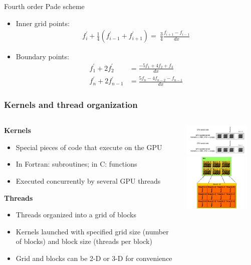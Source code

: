 \documentclass[10pt]{beamer}
\begin{document}
\begin{frame}{Fourth order Pade scheme}
\begin{itemize}
\item{Inner grid points:
\begin{align*}
f_i^{\prime} + \frac{1}{4}(f^{\prime}_{i-1} + f^{\prime}_{i+1}) = \
\frac{3}{4}\frac{f_{i+1} - f_{i-1}}{dx}
\end{align*}}

\item{Boundary points:
\begin{align*}
f^{\prime}_1 + 2f^{\prime}_2 &= \frac{-5f_1 + 4f_2 + f_3}{dx} \\
%
f^{\prime}_{n} + 2f^{\prime}_{n-1}
&=
\frac{5f_{n} - 4f_{n-2} -  f_{n-1}}{dx}
\end{align*}}
\end{itemize}
\end{frame}

\begin{frame}
\frametitle{Kernels and thread organization}
\begin{columns}
\begin{column}{0.5\textwidth}
\textbf{Kernels}
\begin{itemize}
\item Special pieces of code that execute on the GPU
\item In Fortran: subroutines; in C: functions
\item Executed concurrently by several GPU threads
\end{itemize}
\textbf{Threads}
\begin{itemize}
\item Threads organized into a grid of blocks
\item Kernels launched with specified grid size
    (number of blocks) and block size (threads per block)
\item Grid and blocks can be 2-D or 3-D for convenience
\end{itemize}
\end{column}
\begin{column}{0.5\textwidth}
\includegraphics[width=120px]{img/program-structure.png}
\vspace{1cm}
\includegraphics[width=120px]{img/grid-of-thread-blocks.png}
\end{column}
\end{columns}
\end{frame}
\end{document}
